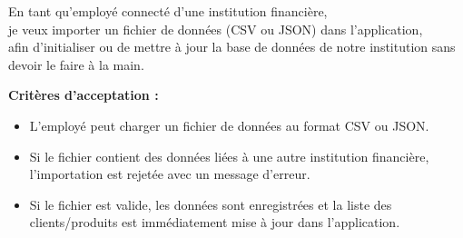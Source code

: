 En tant qu'employé connecté d'une institution financière,\\
je veux importer un fichier de données (CSV ou JSON) dans
l'application,\\
afin d'initialiser ou de mettre à jour la base de données de notre
institution sans devoir le faire à la main.

\textbf{Critères d'acceptation :}

\begin{itemize}
\tightlist
\item
  L'employé peut charger un fichier de données au format CSV ou JSON.
\item
  Si le fichier contient des données liées à une autre institution
  financière, l'importation est rejetée avec un message d'erreur.
\item
  Si le fichier est valide, les données sont enregistrées et la liste
  des clients/produits est immédiatement mise à jour dans l'application.
\end{itemize}

